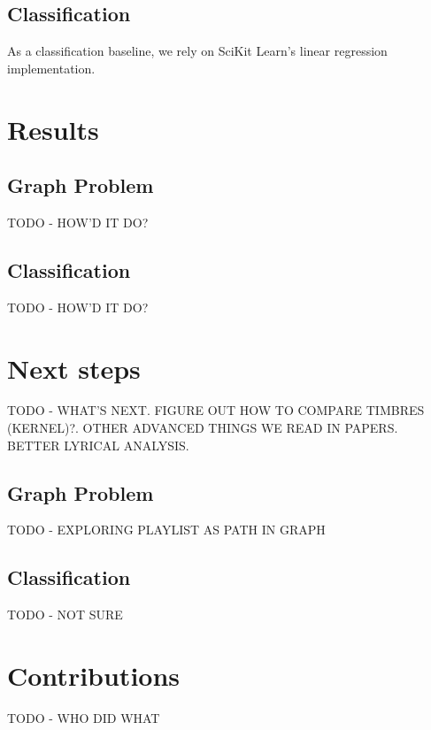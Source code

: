\documentclass[10pt,journal,compsoc]{IEEEtran}
\begin{document}
\subsection{Classification}
As a classification baseline, we rely on SciKit Learn's linear regression implementation.

\section{Results}

\subsection{Graph Problem}
TODO - HOW'D IT DO?

\subsection{Classification}
TODO - HOW'D IT DO?

\section{Next steps}
TODO - WHAT'S NEXT. FIGURE OUT HOW TO COMPARE TIMBRES (KERNEL)?. OTHER ADVANCED THINGS WE READ IN PAPERS. BETTER LYRICAL ANALYSIS.

\subsection{Graph Problem}
TODO - EXPLORING PLAYLIST AS PATH IN GRAPH

\subsection{Classification}
TODO - NOT SURE

\section{Contributions}
TODO - WHO DID WHAT

{}


%

\end{document}
